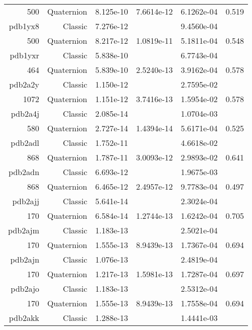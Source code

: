 \begin{xltabular}{\textwidth}{r|rS[table-format=1.3e+2]S[table-format=1.4e+2]S[table-format=1.4e+2]S[table-format=-1.3]}
500 & Quaternion & 8.125e-10 & 7.6614e-12 & 6.1262e-04 & 0.519\\  \addlinespace
{\color{red} pdb1yx8 } & Classic & 7.276e-12 &  & 9.4560e-04 & \\
500 & Quaternion & 8.217e-12 & 1.0819e-11 & 5.1811e-04 & 0.548\\  \addlinespace
{\color{red} pdb1yxr } & Classic & 5.838e-10 &  & 6.7743e-04 & \\
464 & Quaternion & 5.839e-10 & 2.5240e-13 & 3.9162e-04 & 0.578\\  \addlinespace
{\color{red} pdb2a2y } & Classic & 1.150e-12 &  & 2.7595e-02 & \\
1072 & Quaternion & 1.151e-12 & 3.7416e-13 & 1.5954e-02 & 0.578\\  \addlinespace
{\color{red} pdb2a4j } & Classic & 2.085e-14 &  & 1.0704e-03 & \\
580 & Quaternion & 2.727e-14 & 1.4394e-14 & 5.6171e-04 & 0.525\\  \addlinespace
{\color{red} pdb2adl } & Classic & 1.752e-11 &  & 4.6618e-02 & \\
868 & Quaternion & 1.787e-11 & 3.0093e-12 & 2.9893e-02 & 0.641\\  \addlinespace
{\color{red} pdb2adn } & Classic & 6.693e-12 &  & 1.9675e-03 & \\
868 & Quaternion & 6.465e-12 & 2.4957e-12 & 9.7783e-04 & 0.497\\  \addlinespace
{\color{red} pdb2ajj } & Classic & 5.641e-14 &  & 2.3024e-04 & \\
170 & Quaternion & 6.584e-14 & 1.2744e-13 & 1.6242e-04 & 0.705\\  \addlinespace
{\color{red} pdb2ajm } & Classic & 1.183e-13 &  & 2.5021e-04 & \\
170 & Quaternion & 1.555e-13 & 8.9439e-13 & 1.7367e-04 & 0.694\\  \addlinespace
{\color{red} pdb2ajn } & Classic & 1.076e-13 &  & 2.4819e-04 & \\
170 & Quaternion & 1.217e-13 & 1.5981e-13 & 1.7287e-04 & 0.697\\  \addlinespace
{\color{red} pdb2ajo } & Classic & 1.183e-13 &  & 2.5312e-04 & \\
170 & Quaternion & 1.555e-13 & 8.9439e-13 & 1.7558e-04 & 0.694\\  \addlinespace
{\color{red} pdb2akk } & Classic & 1.288e-13 &  & 1.4441e-03 & \\

\end{xltabular}
